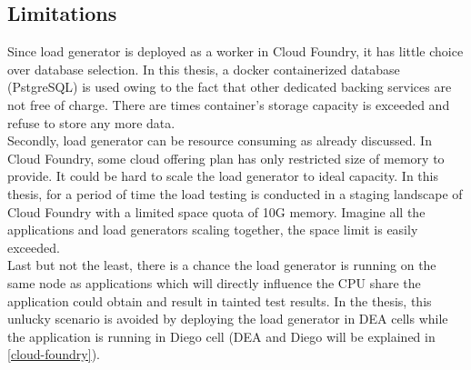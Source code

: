 \subsection{Limitations}
Since load generator is deployed as a worker in Cloud Foundry, it has little choice over database selection. In this thesis, a docker containerized database (PstgreSQL) is used owing to the fact that other dedicated backing services are not free of charge. There are times container's storage capacity is exceeded and refuse to store any more data. \\
Secondly, load generator can be resource consuming as already discussed. In Cloud Foundry, some cloud offering plan has only restricted size of memory to provide. It could be hard to scale the load generator to ideal capacity. In this thesis, for a period of time the load testing is conducted in a staging landscape of Cloud Foundry with a limited space quota of 10G memory. Imagine all the applications and load generators scaling together, the space limit is easily exceeded. \\
Last but not the least, there is a chance the load generator is running on the same node as applications which will directly influence the CPU share the application could obtain and result in tainted test results. In the thesis, this unlucky scenario is avoided by deploying the load generator in DEA cells while the application is running in Diego cell (DEA and Diego will be explained in \ref{cloud-foundry}).

